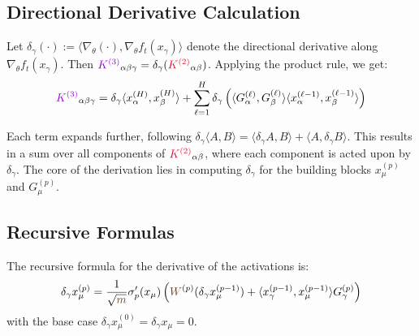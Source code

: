 \documentclass[a4paper]{article}
\newcommand{\W}{\textcolor{weightcolor}{W}}
\newcommand{\m}{\textcolor{weightcolor}{m}}
\theoremstyle{plain}
\theoremstyle{definition}
\theoremstyle{remark}
\begin{document}
\subsection{Directional Derivative Calculation}

Let $\delta_\gamma(\cdot) := \langle \nabla_\theta (\cdot), \nabla_\theta f_t(x_\gamma) \rangle$ denote the directional derivative along $\nabla_\theta f_t(x_\gamma)$. Then $\textcolor{k3color}{K^{(3)}}_{\alpha\beta\gamma} = \delta_\gamma(\textcolor{kernelcolor}{\textcolor{kernelcolor}{K}^{(2)}}_{\alpha\beta})$. Applying the product rule, we get:
\begin{align}
\textcolor{k3color}{K^{(3)}}_{\alpha\beta\gamma} = \delta_\gamma \langle x^{(H)}_\alpha, x^{(H)}_\beta \rangle + \sum_{\ell=1}^{H} \delta_\gamma \left( \langle G^{(\ell)}_\alpha, G^{(\ell)}_\beta \rangle \langle x^{(\ell-1)}_\alpha, x^{(\ell-1)}_\beta \rangle \right)
\end{align}

Each term expands further, following $\delta_\gamma \langle A, B \rangle = \langle \delta_\gamma A, B \rangle + \langle A, \delta_\gamma B \rangle$. This results in a sum over all components of $\textcolor{kernelcolor}{\textcolor{kernelcolor}{K}^{(2)}}_{\alpha\beta}$, where each component is acted upon by $\delta_\gamma$. The core of the derivation lies in computing $\delta_\gamma$ for the building blocks $x^{(p)}_\mu$ and $G^{(p)}_\mu$.




\subsection{Recursive Formulas}

The recursive formula for the derivative of the activations is:
\begin{equation}
\delta_\gamma x^{(p)}_\mu = \frac{1}{\sqrt{\m}} \sigma'_{p}(x_\mu) \left( \W^{(p)} (\delta_\gamma x^{(p-1)}_\mu) + \langle x^{(p-1)}_\gamma, x^{(p-1)}_\mu \rangle G^{(p)}_\gamma \right)
\end{equation}
with the base case $\delta_\gamma x^{(0)}_\mu = \delta_\gamma x_\mu = 0$.
\end{document}
